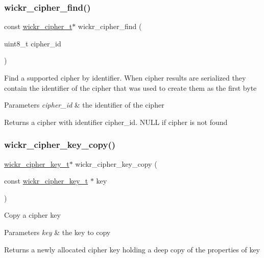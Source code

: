 \subsubsection{\texorpdfstring{wickr\+\_\+cipher\+\_\+find()}{wickr\_cipher\_find()}}
{\footnotesize\ttfamily const \hyperlink{structwickr__cipher}{wickr\+\_\+cipher\+\_\+t}$\ast$ wickr\+\_\+cipher\+\_\+find (\begin{DoxyParamCaption}\item[{uint8\+\_\+t}]{cipher\+\_\+id }\end{DoxyParamCaption})}

Find a supported cipher by identifier. When cipher results are serialized they contain the identifier of the cipher that was used to create them as the first byte


\begin{DoxyParams}{Parameters}
{\em cipher\+\_\+id} & the identifier of the cipher \\
\hline
\end{DoxyParams}
\begin{DoxyReturn}{Returns}
a cipher with identifier \textquotesingle{}cipher\+\_\+id\textquotesingle{}. N\+U\+LL if cipher is not found 
\end{DoxyReturn}
\mbox{\label{group__wickr__cipher_gaa473bc83f82d6353aa6f4cb4e36bf4f0}} 
\subsubsection{\texorpdfstring{wickr\+\_\+cipher\+\_\+key\+\_\+copy()}{wickr\_cipher\_key\_copy()}}
{\footnotesize\ttfamily \hyperlink{structwickr__cipher__key}{wickr\+\_\+cipher\+\_\+key\+\_\+t}$\ast$ wickr\+\_\+cipher\+\_\+key\+\_\+copy (\begin{DoxyParamCaption}\item[{const \hyperlink{structwickr__cipher__key}{wickr\+\_\+cipher\+\_\+key\+\_\+t} $\ast$}]{key }\end{DoxyParamCaption})}

Copy a cipher key


\begin{DoxyParams}{Parameters}
{\em key} & the key to copy \\
\hline
\end{DoxyParams}
\begin{DoxyReturn}{Returns}
a newly allocated cipher key holding a deep copy of the properties of \textquotesingle{}key\textquotesingle{} 
\end{DoxyReturn}
\mbox{\label{group__wickr__cipher_ga73e2a916ba0ff19517e30a65a68390f0}} 
